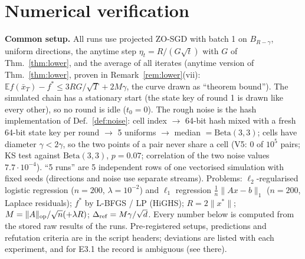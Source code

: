 \documentclass[11pt,a4paper]{article}
\numberwithin{equation}{section}
\theoremstyle{definition}
\theoremstyle{remark}
\newcommand{\E}{\mathbb E}\newcommand{\R}{\mathbb R}\newcommand{\Z}{\mathbb Z}\newcommand{\Prob}{\mathbb P}
\newcommand{\norm}[1]{\lVert #1\rVert}\newcommand{\abs}[1]{\lvert #1\rvert}\newcommand{\ip}[2]{\langle #1,#2\rangle}
\begin{document}
\section{Numerical verification}\label{sec:num}
\textbf{Common setup.} All runs use projected ZO-SGD with batch 1 on $B_{R-\gamma}$, uniform directions, the anytime step $\eta_t=R/(G\sqrt t)$ with $G$ of Thm.~\ref{thm:lower}, and the average of all iterates (anytime version of Thm.~\ref{thm:lower}, proven in Remark~\ref{rem:lower}(vii): $\E f(\bar x_T)-f^*\le3RG/\sqrt T+2M\gamma$, the curve drawn as ``theorem bound''). The simulated chain has a stationary start (the state key of round 1 is drawn like every other), so no round is idle ($t_0=0$). The rough noise is the hash implementation of Def.~\ref{def:noise}: cell index $\to$ 64-bit hash mixed with a fresh 64-bit state key per round $\to$ 5 uniforms $\to$ median $=\mathrm{Beta}(3,3)$; cells have diameter $\gamma<2\gamma$, so the two points of a pair never share a cell (V5: $0$ of $10^5$ pairs; KS test against $\mathrm{Beta}(3,3)$, $p=0.07$; correlation of the two noise values $7.7\cdot10^{-4}$). ``5 runs'' are 5 independent rows of one vectorised simulation with fixed seeds (directions and noise use separate streams). Problems: $\ell_2$-regularised logistic regression ($n=200$, $\lambda=10^{-2}$) and $\ell_1$ regression $\frac1n\norm{Ax-b}_1$ ($n=200$, Laplace residuals); $f^*$ by L-BFGS / LP (HiGHS); $R=2\norm{x^*}$; $M=\norm A_{\rm op}/\sqrt n(+\lambda R)$; $\Delta_{\rm ref}=M\gamma/\sqrt d$. Every number below is computed from the stored raw results of the runs. Pre-registered setups, predictions and refutation criteria are in the script headers; deviations are listed with each experiment, and for E3.1 the record is ambiguous (see there).
\end{document}
